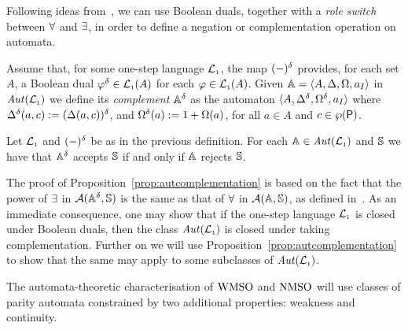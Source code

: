 Following ideas from~\cite{Muller1987,DBLP:conf/calco/KissigV09}, we can use
Boolean duals, together with a \emph{role switch} between $\forall$ and
$\exists$, in order to define a negation or complementation operation on 
automata.

\begin{definition}
\label{d:caut}
Assume that, for some one-step language $\mathcal{L}_{\scriptscriptstyle 1}$, the map $(-)^{\delta}$
provides, for each set $A$, a Boolean dual $\varphi^{\delta} \in \mathcal{L}_{\scriptscriptstyle 1}(A)$ for each
$\varphi \in \mathcal{L}_{\scriptscriptstyle 1}(A)$.
Given $\mathbb{A} = \langle{A,\Delta,\Omega,a_I}\rangle$ in $\mathit{Aut}(\mathcal{L}_{\scriptscriptstyle 1})$ we define its
\emph{complement} $\mathbb{A}^{\delta}$ as the automaton
$\langle{A,\Delta^{\delta},\Omega^{\delta},a_I}\rangle$
where $\Delta^{\delta}(a,c) := (\Delta(a,c))^{\delta}$, and $\Omega^{\delta}(a)
:= 1 + \Omega(a)$, for all $a \in A$ and $c \in \wp(\mathsf{P})$.
\end{definition}

\begin{proposition}
\label{prop:autcomplementation}
Let $\mathcal{L}_{\scriptscriptstyle 1}$ and $(-)^{\delta}$ be as in the previous definition.
For each $\mathbb{A} \in \mathit{Aut}(\mathcal{L}_{\scriptscriptstyle 1})$ and $\mathbb{S}$ we have that $\mathbb{A}^{\delta}$ accepts
$\mathbb{S}$ if and only if $\mathbb{A}$ rejects $\mathbb{S}$.
\end{proposition}

The proof of Proposition~\ref{prop:autcomplementation} is based on the fact
that the power of $\exists$ in $\mathcal{A}(\mathbb{A}^{\delta},\mathbb{S})$ is the same
as that of $\forall$ in $\mathcal{A}(\mathbb{A},\mathbb{S})$, as defined in~\cite{DBLP:conf/calco/KissigV09}. As an immediate consequence, one may show that if the
one-step language $\mathcal{L}_{\scriptscriptstyle 1}$ is closed under Boolean duals, then the class
$\mathit{Aut}(\mathcal{L}_{\scriptscriptstyle 1})$ is closed under taking complementation.
Further on we will use Proposition~\ref{prop:autcomplementation} to show that
the same may apply to some subclasses of $\mathit{Aut}(\mathcal{L}_{\scriptscriptstyle 1})$.

The automata-theoretic characterisation of $\mathrm{WMSO}$ and $\mathrm{NMSO}$ will use classes 
of parity automata constrained by two additional properties: weakness
and continuity. 

